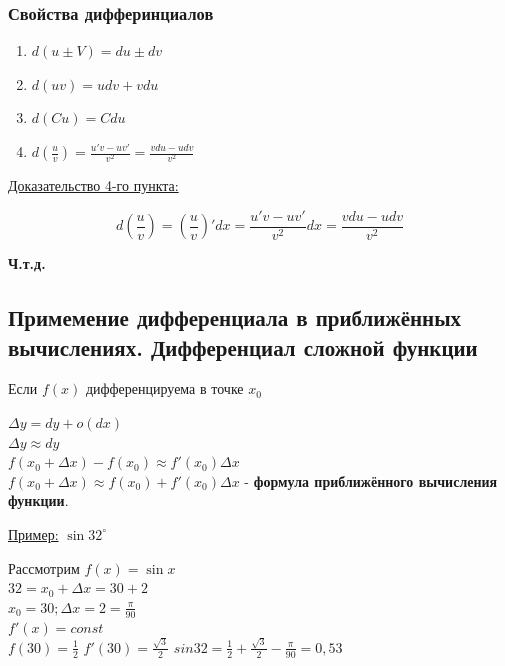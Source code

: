 \documentclass[12pt]{article}
\begin{document}
    \subsubsection*{Свойства дифферинциалов}
    \begin{enumerate}
        \item $d(u \pm V)=du \pm dv$
        \item $d(uv)=udv+vdu$
        \item $d(Cu)=Cdu$
        \item $d(\frac{u}{v})=\frac{u'v-uv'}{v^2}=\frac{vdu-udv}{v^2}$
    \end{enumerate} 
    \underline{Доказательство 4-го пункта:}
    \begin{adjustwidth}{1.5em}{1.5em}
        \[d\left(\frac{u}{v}\right)=\left(\frac{u}{v}\right)'dx=\frac{u'v-uv'}{v^2}dx=\frac{vdu-udv}{v^2}\]
        \begin{center}
            \textbf{Ч.т.д.}
        \end{center}
    \end{adjustwidth}
    \subsection{Примемение дифференциала в приближённых вычислениях. Дифференциал сложной функции}
    \noindent Если $f(x)$ дифференцируема в точке $x_0$
    \begin{adjustwidth}{1.5em}{1.5em}
        $\Delta y=dy+o(dx)$\\
        $\Delta y \approx dy$\\
        $f(x_0+\Delta x)-f(x_0) \approx f'(x_0) \Delta x$\\
        $f(x_0+\Delta x) \approx f(x_0)+f'(x_0) \Delta x$ - \textbf{формула приближённого вычисления функции}.
    \end{adjustwidth}
    \underline{Пример:} $\sin 32^\circ$
    \begin{adjustwidth}{1.5em}{1.5em}
        Рассмотрим $f(x)=\sin x$\\
        $32 = x_0+\Delta x=30 + 2$\\
        $x_0=30;\Delta x = 2 = \frac{\pi}{90}$\\
        $f'(x)=const$\\
        $f(30)=\frac{1}{2}$
        $f'(30)=\frac{\sqrt{3}}{2}$
        $sin 32 = \frac{1}{2}+\frac{\sqrt{3}}{2}-\frac{\pi}{90}=0,53$    
    \end{adjustwidth}
\end{document}
